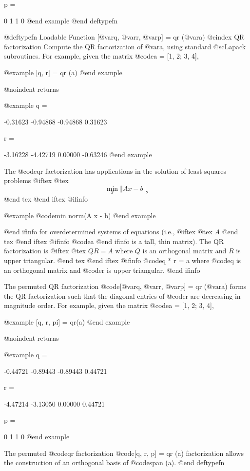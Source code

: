 p =

  0  1
  1  0
@end example
@end deftypefn

@deftypefn {Loadable Function} {[@var{q}, @var{r}, @var{p}] =} qr (@var{a})
@cindex QR factorization
Compute the QR factorization of @var{a}, using standard @sc{Lapack}
subroutines.  For example, given the matrix @code{a = [1, 2; 3, 4]},

@example
[q, r] = qr (a)
@end example

@noindent
returns

@example
q =

  -0.31623  -0.94868
  -0.94868   0.31623

r =

  -3.16228  -4.42719
   0.00000  -0.63246
@end example

The @code{qr} factorization has applications in the solution of least
squares problems
@iftex
@tex
$$
\min_x \left\Vert A x - b \right\Vert_2
$$
@end tex
@end iftex
@ifinfo

@example
@code{min norm(A x - b)}
@end example

@end ifinfo
for overdetermined systems of equations (i.e.,
@iftex
@tex
$A$
@end tex
@end iftex
@ifinfo
@code{a}
@end ifinfo
 is a tall, thin matrix).  The QR factorization is
@iftex
@tex
$QR = A$ where $Q$ is an orthogonal matrix and $R$ is upper triangular.
@end tex
@end iftex
@ifinfo
@code{q * r = a} where @code{q} is an orthogonal matrix and @code{r} is
upper triangular.
@end ifinfo

The permuted QR factorization @code{[@var{q}, @var{r}, @var{p}] =
qr (@var{a})} forms the QR factorization such that the diagonal
entries of @code{r} are decreasing in magnitude order.  For example,
given the matrix @code{a = [1, 2; 3, 4]},

@example
[q, r, pi] = qr(a)
@end example

@noindent
returns

@example
q = 

  -0.44721  -0.89443
  -0.89443   0.44721

r =

  -4.47214  -3.13050
   0.00000   0.44721

p =

   0  1
   1  0
@end example

The permuted @code{qr} factorization @code{[q, r, p] = qr (a)}
factorization allows the construction of an orthogonal basis of
@code{span (a)}.
@end deftypefn

